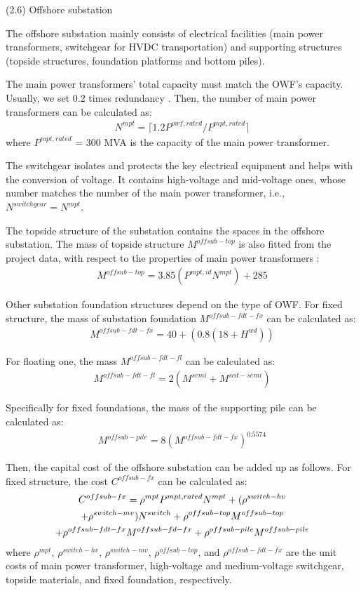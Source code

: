 \documentclass[sn-mathphys,Numbered]{sn-jnl}%
\theoremstyle{thmstyleone}%
\theoremstyle{thmstyletwo}%
\theoremstyle{thmstylethree}%
\begin{document}
(2.6) Offshore substation

The offshore substation mainly consists of electrical facilities (main power transformers, switchgear for HVDC transportation) and supporting structures (topside structures, foundation platforms and bottom piles). 

The main power transformers' total capacity must match the OWF's capacity. Usually, we set 0.2 times redundancy \cite{guo2023grid}. Then, the number of main power transformers can be calculated as:
\begin{align}
    N^{mpt} = \lceil{1.2 P^{owf,rated} /  P^{mpt,rated}}\rceil
\end{align}
where $P^{mpt,rated}$ = 300 MVA is the capacity of the main power transformer. 

The switchgear isolates and protects the key electrical equipment and helps with the conversion of voltage. It contains high-voltage and mid-voltage ones, whose number matches the number of the main power transformer, i.e., $N^{switchgear} = N^{mpt}$.

The topside structure of the substation contains the spaces in the offshore substation. The mass of topside structure $M^{offsub-top}$ is also fitted from the project data, with respect to the properties of main power transformers \cite{NRELOffshoreBalance}:
\begin{align}
    M^{offsub-top} = 3.85 (P^{mpt,id} N^{mpt}) + 285
\end{align}

Other substation foundation structures depend on the type of OWF. For fixed structure, the mass of substation foundation $M^{offsub-fdt-fx}$ can be calculated as:
\begin{gather}
    M^{offsub-fdt-fx} = 40 + (0.8(18+H^{wd}))
\end{gather}

For floating one, the mass $M^{offsub-fdt-fl}$ can be calculated as:
\begin{gather}
    M^{offsub-fdt-fl} = 2(M^{semi} + M^{scd-semi})
\end{gather}

Specifically for fixed foundations, the mass of the supporting pile can be calculated as:
\begin{gather}
    M^{offsub-pile} = 8 (M^{offsub-fdt-fx})^{0.5574}
\end{gather}

Then, the capital cost of the offshore substation can be added up as follows. 
For fixed structure, the cost $C^{offsub-fx}$ can be calculated as:
\begin{gather}
    C^{offsub-fx} = \rho^{mpt} P^{mpt,rated} N^{mpt} + (\rho^{switch-hv} 
\notag\\
    + \rho^{switch-mv}) N^{switch} + \rho^{offsub-top} M^{offsub-top} 
    \notag\\
    + \rho^{offsub-fdt-fx} M^{offsub-fd-fx} + \rho^{offsub-pile} M^{offsub-pile}
\end{gather}
where $\rho^{mpt}$, $\rho^{switch-hv}$, $\rho^{switch-mv}$, $\rho^{offsub-top}$, and $\rho^{offsub-fdt-fx}$ are the unit costs of main power transformer, high-voltage and medium-voltage switchgear, topside materials, and fixed foundation, respectively.
\end{document}
